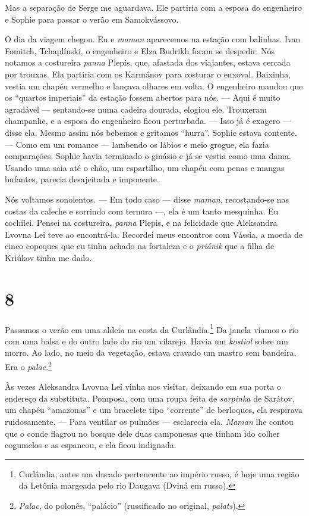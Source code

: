 Mas a separação de Serge me aguardava. Ele partiria com a esposa do
engenheiro e Sophie para passar o verão em Samokvássovo.

O dia da viagem chegou. Eu e \emph{maman} aparecemos na estação com
balinhas. Ivan Fomitch, Tchaplínski, o engenheiro e Elza Budrikh foram
se despedir. Nós notamos a costureira \emph{panna} Plepis, que, afastada
dos viajantes, estava cercada por trouxas. Ela partiria com os Karmánov
para costurar o enxoval. Baixinha, vestia um chapéu vermelho e lançava
olhares em volta. O engenheiro mandou que os ``quartos imperiais'' da
estação fossem abertos para nós. --- Aqui é muito agradável ---
sentando-se numa cadeira dourada, elogiou ele. Trouxeram champanhe, e a
esposa do engenheiro ficou perturbada. --- Isso já é exagero --- disse
ela. Mesmo assim nós bebemos e gritamos ``hurra''. Sophie estava
contente. --- Como em um romance --- lambendo os lábios e meio grogue,
ela fazia comparações. Sophie havia terminado o ginásio e já se vestia
como uma dama. Usando uma saia até o chão, um espartilho, um chapéu com
penas e mangas bufantes, parecia desajeitada e imponente.

Nós voltamos sonolentos. --- Em todo caso --- disse \emph{maman},
recostando-se nas costas da caleche e sorrindo com ternura ---, ela é um
tanto mesquinha. Eu cochilei. Pensei na costureira, \emph{panna} Plepis,
e na felicidade que Aleksandra Lvovna Lei teve ao encontrá-la. Recordei
meus encontros com Vássia, a moeda de cinco copeques que eu tinha achado
na fortaleza e o \emph{priánik} que a filha de Kriúkov tinha me dado.

\section{8}

Passamos o verão em uma aldeia na costa da Curlândia.\footnote{Curlândia,
  antes um ducado pertencente ao império russo, é hoje uma região da
  Letônia margeada pelo rio Daugava (Dviná em russo).} Da janela víamos
o rio com uma balsa e do outro lado do rio um vilarejo. Havia um
\emph{kostiol} sobre um morro. Ao lado, no meio da vegetação, estava
cravado um mastro sem bandeira. Era o \emph{palac}.\footnote{\emph{Palac},
  do polonês, ``palácio'' (russificado no original, \emph{palats}).}

Às vezes Aleksandra Lvovna Lei vinha nos visitar, deixando em sua porta
o endereço da substituta. Pomposa, com uma roupa feita de
\emph{sarpinka} de Sarátov, um chapéu ``amazonas'' e um bracelete tipo
``corrente'' de berloques, ela respirava ruidosamente. --- Para ventilar
os pulmões --- esclarecia ela. \emph{Maman} lhe contou que o conde
flagrou no bosque dele duas camponesas que tinham ido colher cogumelos e
as espancou, e ela ficou indignada.

